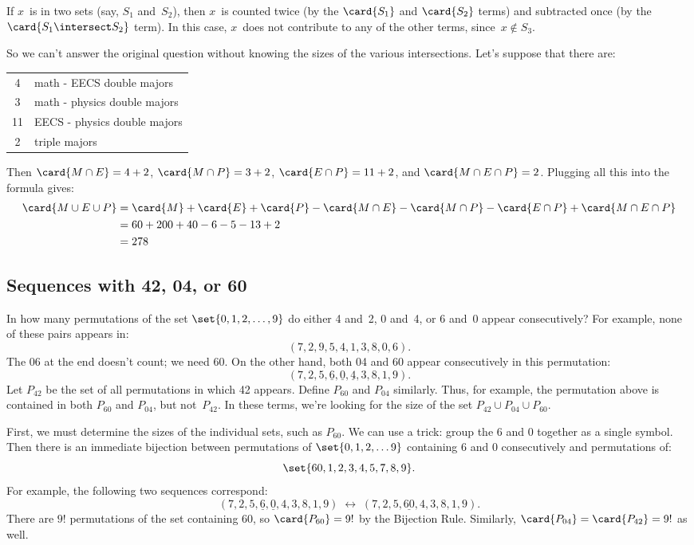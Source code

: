 If $x$~is in two sets (say, $S_1$ and~$S_2$), then $x$~is counted
twice (by the $\card{S_1}$ and $\card{S_2}$ terms) and subtracted once
(by the $\card{S_1 \intersect S_2}$ term).  In this case, $x$~does not
contribute to any of the other terms, since~$x \notin S_3$.

So we can't answer the original question without knowing the sizes of
the various intersections.  Let's suppose that there are:
%
\begin{center}
\begin{tabular}{cl}
4 & math - EECS double majors \\
3 & math - physics double majors \\
11 & EECS - physics double majors \\
2 & triple majors
\end{tabular}
\end{center}
%
Then $\card{M \cap E} = 4 + 2$, $\card{M \cap P} = 3 + 2$, $\card{E
\cap P} = 11 + 2$, and $\card{M \cap E \cap P} = 2$.  Plugging all this
into the formula gives:
%
\begin{align*}
\card{M \cup E \cup P}
    & = \card{M} + \card{E} + \card{P}
      - \card{M \cap E} - \card{M \cap P} - \card{E \cap P}
      + \card{M \cap E \cap P} \\
    & = 60 + 200 + 40 - 6 - 5 - 13 + 2 \\
    & = 278
\end{align*}

\subsection{Sequences with 42, 04, or 60}

In how many permutations of the set $\set{0, 1, 2, \dots, 9}$ do
either 4 and~2, 0 and~4, or 6 and~0 appear consecutively?  For
example, none of these pairs appears in:
%
\[
(7, 2, 9, 5, 4, 1, 3, 8, 0, 6).
\]
%
The 06 at the end doesn't count; we need 60.  On the other hand, both
04 and 60 appear consecutively in this permutation:
%
\[
(7, 2, 5, \underline{6}, \underline{0}, \underline{4}, 3, 8, 1, 9).
\]
%
Let $P_{42}$ be the set of all permutations in which 42 appears.
Define $P_{60}$ and $P_{04}$ similarly.  Thus, for example, the
permutation above is contained in both $P_{60}$ and $P_{04}$, but
not~$P_{42}$.  In these terms, we're looking for the size of the set
$P_{42} \cup P_{04} \cup P_{60}$.

First, we must determine the sizes of the individual sets, such as
$P_{60}$.  We can use a trick: group the 6 and 0 together as a single
symbol.  Then there is an immediate bijection between permutations of
$\set{0, 1, 2, \dots 9}$ containing 6 and 0 consecutively and
permutations of:
%
\[
\set{60, 1, 2, 3, 4, 5, 7, 8, 9}.
\]
%
For example, the following two sequences correspond:
%
\[
(7, 2, 5, \underline{6}, \underline{0}, 4, 3, 8, 1, 9)
\; \longleftrightarrow \;
(7, 2, 5, \underline{60}, 4, 3, 8, 1, 9).
\]
%
There are $9!$ permutations of the set containing 60, so
$\card{P_{60}} = 9!$ by the Bijection Rule.  Similarly, $\card{P_{04}}
= \card{P_{42}} = 9!$ as well.


